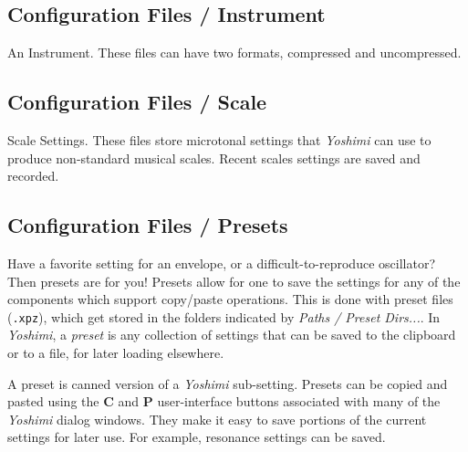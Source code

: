 \subsection{Configuration Files / Instrument}
\label{subsec:configuration_instrument}

   An Instrument.  These files can have two formats, compressed and
   uncompressed.

\subsection{Configuration Files / Scale}
\label{subsec:configuration_scale}

   Scale Settings.  These files store microtonal settings that \textsl{Yoshimi}
   can use to produce non-standard musical scales.  Recent scales settings are
   saved and recorded.

\subsection{Configuration Files / Presets}
\label{subsec:configuration_preset}

   Have a favorite setting for an envelope, or a difficult-to-reproduce
   oscillator? Then presets are for you! Presets allow for one to save the
   settings for any of the components which support copy/paste operations.
   This is done with preset files (\texttt{.xpz}), which get stored in the
   folders indicated by \textsl{Paths / Preset Dirs...}.
   In \textsl{Yoshimi}, a
   \textsl{preset} is any collection of settings that can be saved to the
   clipboard or to a file, for later loading elsewhere.

   A preset is canned version of a \textsl{Yoshimi} sub-setting.  Presets can be
   copied and pasted using the \textbf{C} and \textbf{P} user-interface buttons
   associated with many of the \textsl{Yoshimi} dialog windows.  They make it
   easy to save portions of the current settings for later use.  For example,
   resonance settings can be saved.


